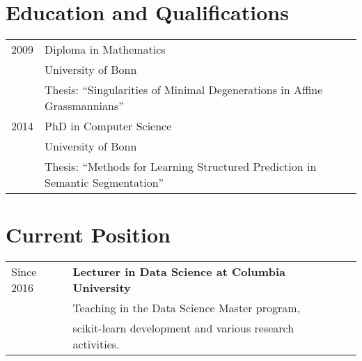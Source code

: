 \documentclass[a4paper,11pt]{article}
\begin{document}
\maketitle

\section{Education and Qualifications}
\begin{tabular}{lll}
    2009 & Diploma in Mathematics \\ & University of Bonn\\
         & Thesis: ``Singularities of Minimal Degenerations in Affine Grassmannians'' \\
    2014 & PhD in Computer Science \\ & University of Bonn \\
         & Thesis: ``Methods for Learning Structured Prediction in Semantic Segmentation''
\end{tabular}

\section{Current Position}
\begin{tabular}{lll}
    Since 2016 & \textbf{Lecturer in Data Science at Columbia University}\\
               & Teaching in the Data Science Master program,\\
	       & scikit-learn development and various research activities.\\
\end{tabular}
\end{document}
